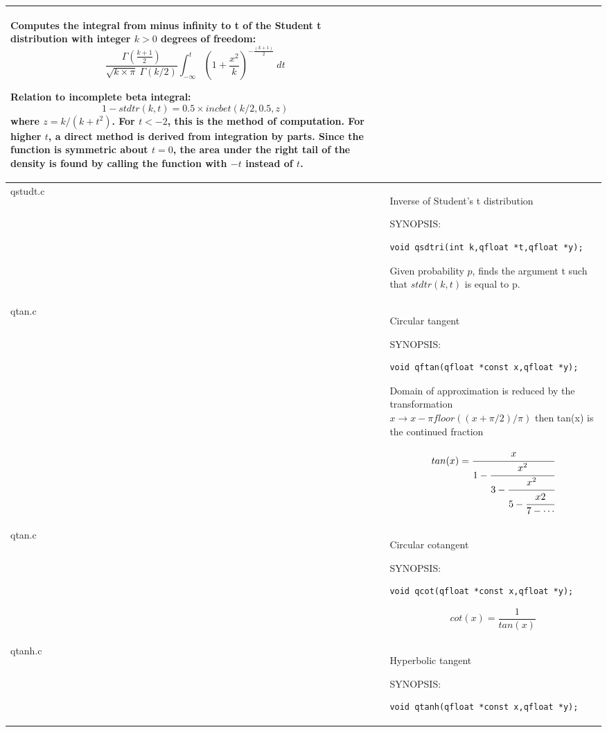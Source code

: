 \documentclass[10pt,a4paper,x11names]{memoir} %
\begin{document}
\begin{longtable}{|p{1.5cm}|p{11.5cm}|}
	Computes the integral from minus infinity to t of the Student
	t distribution with integer $k > 0$ degrees of freedom:
	$$\frac{\Gamma (\frac{k+1}{2})}{\sqrt{k \times \pi}\ \Gamma (k/2)}\int_{-\infty}^{t}\left( 1+\frac{x^2}{k}
	\right)^{-\frac{(k+1)}{2}}\ dt$$
	
	Relation to incomplete beta integral:
	$$ 1-stdtr(k,t)=0.5 \times incbet(k/2,0.5,z)$$
	where
	$ z = k/(k + t^2)$.
	For $t < -2$, this is the method of computation.  For higher $t$,
	a direct method is derived from integration by parts.
	Since the function is symmetric about $t=0$, the area under the
	right tail of the density is found by calling the function
	with $-t$ instead of $t$.
	\\\hline
	qstudt.c& Inverse of Student's t distribution
	
	{\footnotesize SYNOPSIS:}\vspace{-0.2cm}
	\begin{lstlisting}[numbers=none]
		void qsdtri(int k,qfloat *t,qfloat *y);
	\end{lstlisting}\vspace{-0.2cm}
	Given probability $p$, finds the argument t such that $stdtr(k,t)$ is equal to p.
	\\\hline
	qtan.c& Circular tangent
	
	{\footnotesize SYNOPSIS:}\vspace{-0.2cm}
	\begin{lstlisting}[numbers=none]
		void qftan(qfloat *const x,qfloat *y);
	\end{lstlisting}\vspace{-0.2cm}
	Domain of approximation is reduced by the transformation
	$x \rightarrow x - \pi floor((x + \pi/2)/\pi)$
	then tan(x) is the continued fraction
	
	$$tan(x)=\cfrac{x}{1-\cfrac{x^2}{3-\cfrac{x^2}{5-\cfrac{x2}{7-\dotsb}}}}$$
	\\\hline
	qtan.c& Circular cotangent
	
	{\footnotesize SYNOPSIS:}\vspace{-0.2cm}
	\begin{lstlisting}[numbers=none]
		void qcot(qfloat *const x,qfloat *y);
	\end{lstlisting}\vspace{-0.2cm}
	$$ cot(x)=\frac{1}{tan(x)}$$
	\\\hline
	qtanh.c& Hyperbolic tangent
	
	{\footnotesize SYNOPSIS:}\vspace{-0.2cm}
	\begin{lstlisting}[numbers=none]
		void qtanh(qfloat *const x,qfloat *y);
	\end{lstlisting}\vspace{-0.2cm}
	

\end{longtable}
\end{document}
